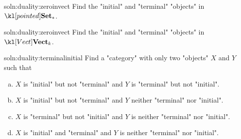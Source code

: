 \documentclass[main.tex]{subfiles}
\begin{document}
\begin{exer}{soln:duality:zeroinvect}\label{exer:duality:zeroinptd}
	Find the "initial" and "terminal" "objects" in $\catPtd$.
\end{exer}
\begin{exer}{soln:duality:zeroinvect}\label{exer:duality:zeroinvect}
	Find the "initial" and "terminal" "objects" in $\catVect{k}$.
\end{exer}
\begin{exer}{soln:duality:terminalinitial}\label{exer:duality:terminalinitial}
	Find a "category" with only two "objects" $X$ and $Y$ such that
	\begin{enumerate}[(a)]
		\item $X$ is "initial" but not "terminal" and $Y$ is "terminal" but not "initial".
		\item $X$ is "initial" but not "terminal" and $Y$ neither "terminal" nor "initial".
		\item $X$ is "terminal" but not "initial" and $Y$ is neither "terminal" nor "initial".
		\item $X$ is "initial" and "terminal" and $Y$ is neither "terminal" nor "initial".
	\end{enumerate} 
\end{exer}
\end{document}
